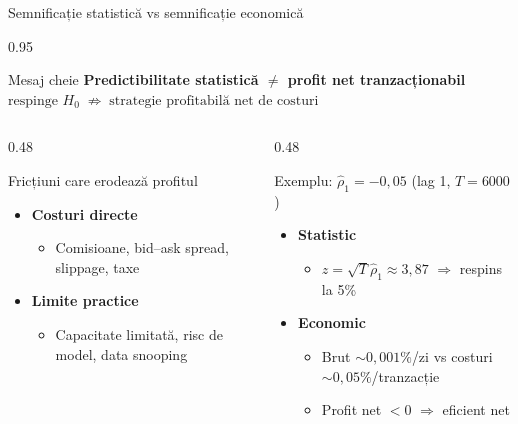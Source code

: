 \documentclass[9pt, aspectratio=169, t]{beamer}
\begin{document}
\begin{frame}[shrink=15]{Semnificație statistică vs semnificație economică}
\begin{cminipage}{0.95\textwidth}
\begin{alertblock}{Mesaj cheie}
\centering
\textbf{Predictibilitate statistică $\neq$ profit net tranzacționabil}\\[0.1cm]
\footnotesize
$\displaystyle \text{respinge } H_0 \;\not\Rightarrow\; \text{strategie profitabilă net de costuri}$
\end{alertblock}

\vspace{0.1cm}
\begin{columns}[T]
\begin{column}{0.48\textwidth}
\begin{block}{Fricțiuni care erodează profitul}
\footnotesize
\begin{itemize}\setlength{\itemsep}{0pt}
    \item \textbf{Costuri directe}
    \begin{itemize}\setlength{\itemsep}{0pt}
        \item Comisioane, bid--ask spread, slippage, taxe
    \end{itemize}
    \item \textbf{Limite practice}
    \begin{itemize}\setlength{\itemsep}{0pt}
        \item Capacitate limitată, risc de model, data snooping
    \end{itemize}
\end{itemize}
\end{block}
\end{column}
\begin{column}{0.48\textwidth}
\begin{exampleblock}{Exemplu: $\hat\rho_1 = -0{,}05$ (lag 1, $T = 6000$)}
\footnotesize
\begin{itemize}\setlength{\itemsep}{0pt}
    \item \textbf{Statistic}
    \begin{itemize}\setlength{\itemsep}{0pt}
        \item $z = \sqrt{T}\hat\rho_1 \approx 3{,}87$ $\Rightarrow$ respins la 5\%
    \end{itemize}
    \item \textbf{Economic}
    \begin{itemize}\setlength{\itemsep}{0pt}
        \item Brut $\sim 0{,}001\%$/zi vs costuri $\sim 0{,}05\%$/tranzacție
        \item Profit net $< 0$ $\Rightarrow$ eficient net
    \end{itemize}
\end{itemize}
\end{exampleblock}
\end{column}
\end{columns}


\end{cminipage}
\end{frame}
\end{document}
